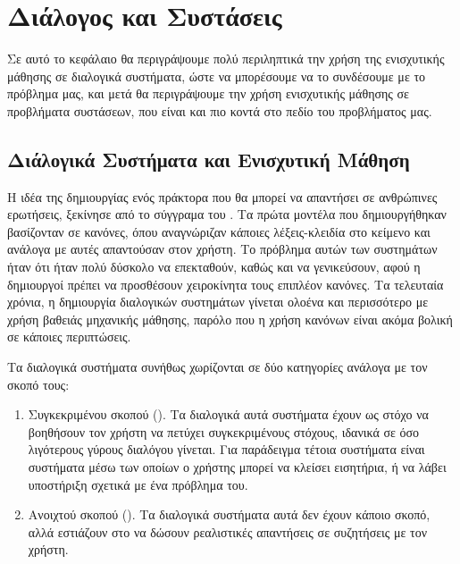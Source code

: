\chapter{Διάλογος και Συστάσεις}

Σε αυτό το κεφάλαιο θα περιγράψουμε πολύ περιληπτικά την χρήση της ενισχυτικής μάθησης σε διαλογικά συστήματα, ώστε να μπορέσουμε να το συνδέσουμε με το πρόβλημα μας, και μετά θα περιγράψουμε την χρήση ενισχυτικής μάθησης σε προβλήματα συστάσεων, που είναι και πιο κοντά στο πεδίο του προβλήματος μας.

\section{Διάλογικά Συστήματα και Ενισχυτική Μάθηση}

Η ιδέα της δημιουργίας ενός πράκτορα που θα μπορεί να απαντήσει σε ανθρώπινες ερωτήσεις, ξεκίνησε από το σύγγραμα του  \cite{turing1950computing}. Τα πρώτα μοντέλα που δημιουργήθηκαν βασίζονταν σε κανόνες, όπου αναγνώριζαν κάποιες λέξεις-κλειδία στο κείμενο και ανάλογα με αυτές απαντούσαν στον χρήστη. Το πρόβλημα αυτών των συστημάτων ήταν ότι ήταν πολύ δύσκολο να επεκταθούν, καθώς και να γενικεύσουν, αφού η δημιουργοί πρέπει να προσθέσουν χειροκίνητα τους επιπλέον κανόνες. Τα τελευταία χρόνια, η δημιουργία διαλογικών συστημάτων γίνεται ολοένα και περισσότερο με χρήση βαθειάς μηχανικής μάθησης, παρόλο που η χρήση κανόνων είναι ακόμα βολική σε κάποιες περιπτώσεις.

Tα διαλογικά συστήματα συνήθως χωρίζονται σε δύο κατηγορίες ανάλογα με τον σκοπό τους:
\begin{enumerate}
    \item Συγκεκριμένου σκοπού (). Τα διαλογικά αυτά συστήματα έχουν ως στόχο να βοηθήσουν τον χρήστη να πετύχει συγκεκριμένους στόχους, ιδανικά σε όσο λιγότερους γύρους διαλόγου γίνεται. Για παράδειγμα τέτοια συστήματα είναι συστήματα μέσω των οποίων ο χρήστης μπορεί να κλείσει εισητήρια, ή να λάβει υποστήριξη σχετικά με ένα πρόβλημα του.
    \item Ανοιχτού σκοπού (). Τα διαλογικά συστήματα αυτά δεν έχουν κάποιο σκοπό, αλλά εστιάζουν στο να δώσουν ρεαλιστικές απαντήσεις σε συζητήσεις με τον χρήστη. 
\end{enumerate}

